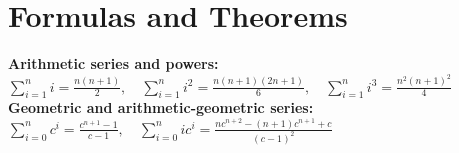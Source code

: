 \documentclass[a4paper,twocolumn]{article}
\newcommand\disappearingrule{%
	\par %
	\vskip5pt %
	\leaders\vrule width 0.4934\textwidth\vskip0.4pt %
	\nointerlineskip %
	\vskip2pt %
}
\begin{document}
\section{Formulas and Theorems}
{\fontsize{8}{8}

\textbf{Arithmetic series and powers:} $\sum\limits_{i=1}^n i = \frac{n(n+1)}{2}, \quad \sum\limits_{i=1}^n i^2 = \frac{n(n+1)(2n+1)}{6}, \quad \sum\limits_{i=1}^n i^3 = \frac{n^2(n+1)^2}{4}$ \\
\textbf{Geometric and arithmetic-geometric series: } $\sum\limits_{i=0}^n c^i = \frac{c^{n+1} - 1}{c-1}, \quad \sum\limits_{i=0}^n ic^i = \frac{nc^{n+2} - (n+1)c^{n+1} + c}{(c-1)^2}$

\disappearingrule

}
\end{document}
